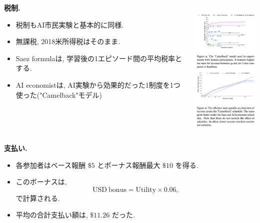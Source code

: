 \documentclass[unicode,aspectratio=169,11pt]{beamer}
\begin{document}
\begin{frame}{}{}
\begin{columns}
    \begin{column}{0.6\textwidth}
        {\bf 税制.}
        \begin{itemize}
            \item 税制もAI市民実験と基本的に同様.
            \item 無課税, 2018米所得税はそのまま.
            \item Saez formulaは, 学習後の1エピソード間の平均税率とする.
            \item AI economistは, AI実験から効果的だった1制度を1つ使った("Camelback"モデル)
        \end{itemize}
    \end{column}
    \begin{column}{0.4\textwidth}
        　\\
        \includegraphics[width=4.7cm]{figure15.png}
    \end{column}
\end{columns}
\end{frame}

\begin{frame}{}{}
{\bf 支払い.}
\begin{itemize}
    \item 各参加者はベース報酬 $\$5$ とボーナス報酬最大 $\$10$ を得る.
    \item このボーナスは, \[\mathrm{USD\ bonus} = \mathrm{Utility}\times 0.06, \tag{26}\]で計算される.
    \item 平均の合計支払い額は, $\$ 11.26$ だった.
\end{itemize}
\end{frame}
\end{document}
